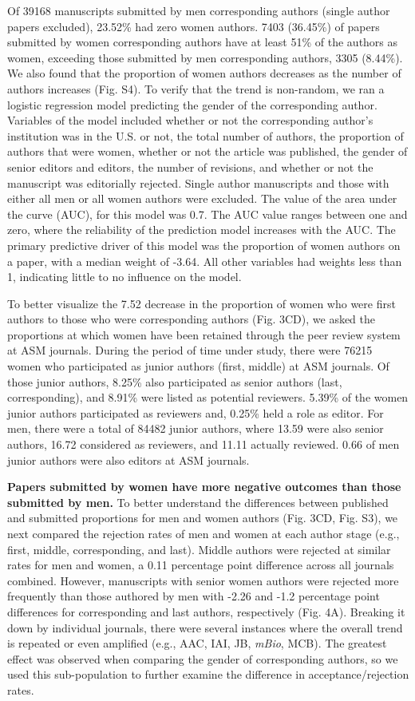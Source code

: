 \documentclass[11pt,]{article}
\begin{document}
Of 39168 manuscripts submitted by men corresponding authors (single
author papers excluded), 23.52\% had zero women authors. 7403 (36.45\%)
of papers submitted by women corresponding authors have at least 51\% of
the authors as women, exceeding those submitted by men corresponding
authors, 3305 (8.44\%). We also found that the proportion of women
authors decreases as the number of authors increases (Fig. S4). To
verify that the trend is non-random, we ran a logistic regression model
predicting the gender of the corresponding author. Variables of the
model included whether or not the corresponding author's institution was
in the U.S. or not, the total number of authors, the proportion of
authors that were women, whether or not the article was published, the
gender of senior editors and editors, the number of revisions, and
whether or not the manuscript was editorially rejected. Single author
manuscripts and those with either all men or all women authors were
excluded. The value of the area under the curve (AUC), for this model
was 0.7. The AUC value ranges between one and zero, where the
reliability of the prediction model increases with the AUC. The primary
predictive driver of this model was the proportion of women authors on a
paper, with a median weight of -3.64. All other variables had weights
less than 1, indicating little to no influence on the model.

To better visualize the 7.52 decrease in the proportion of women who
were first authors to those who were corresponding authors (Fig. 3CD),
we asked the proportions at which women have been retained through the
peer review system at ASM journals. During the period of time under
study, there were 76215 women who participated as junior authors (first,
middle) at ASM journals. Of those junior authors, 8.25\% also
participated as senior authors (last, corresponding), and 8.91\% were
listed as potential reviewers. 5.39\% of the women junior authors
participated as reviewers and, 0.25\% held a role as editor. For men,
there were a total of 84482 junior authors, where 13.59 were also senior
authors, 16.72 considered as reviewers, and 11.11 actually reviewed.
0.66 of men junior authors were also editors at ASM journals.

\textbf{Papers submitted by women have more negative outcomes than those
submitted by men.} To better understand the differences between
published and submitted proportions for men and women authors (Fig. 3CD,
Fig. S3), we next compared the rejection rates of men and women at each
author stage (e.g., first, middle, corresponding, and last). Middle
authors were rejected at similar rates for men and women, a 0.11
percentage point difference across all journals combined. However,
manuscripts with senior women authors were rejected more frequently than
those authored by men with -2.26 and -1.2 percentage point differences
for corresponding and last authors, respectively (Fig. 4A). Breaking it
down by individual journals, there were several instances where the
overall trend is repeated or even amplified (e.g., AAC, IAI, JB,
\emph{mBio}, MCB). The greatest effect was observed when comparing the
gender of corresponding authors, so we used this sub-population to
further examine the difference in acceptance/rejection rates.
\end{document}
